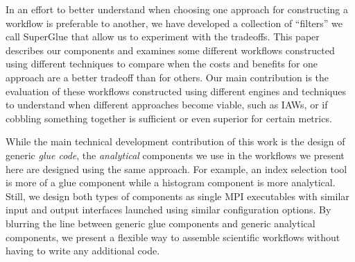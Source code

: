 In an effort to better understand when choosing one approach for constructing a
workflow is preferable to another, we have developed a collection of ``filters''
we call SuperGlue that allow us to experiment with the tradeoffs. This paper
describes our components and examines some different workflows constructed using
different techniques to compare when the costs and benefits for one approach are
a better tradeoff than for others. 
Our main contribution is the evaluation of
these workflows constructed using different engines and techniques to understand
when different approaches become viable, such as IAWs, or if cobbling something
together is sufficient or even superior for certain metrics.

While the main technical development contribution of this work is the design of
generic {\em glue code}, the {\em analytical} components we use in the
workflows we present here are designed using the same approach. For example, an
index selection tool is more of a glue component while a histogram component is
more analytical.  Still, we design both types of components as single MPI
executables with similar input and output interfaces launched using similar
configuration options.  By blurring the line between generic glue components
and generic analytical components, we present a flexible way to assemble
scientific workflows without having to write any additional code. 
\fi

\fi
